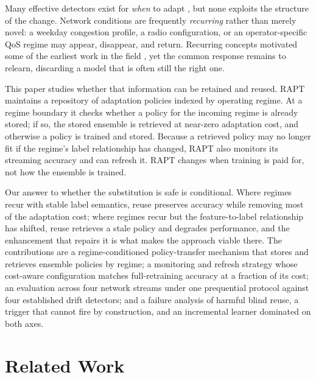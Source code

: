 \documentclass[conference]{IEEEtran}
\begin{document}
Many effective detectors exist for \emph{when} to adapt
\cite{bifet2007learning,page1954continuous,gama2004learning,baena2006early,ross2012exponentially,dos2016fast,brockhoff2020time},
but none exploits the structure of the change. Network conditions are
frequently \emph{recurring} rather than merely novel: a weekday congestion profile,
a radio configuration, or an operator-specific QoS regime may appear, disappear, and
return. Recurring concepts motivated some of the earliest work in the field
\cite{schlimmer1986incremental,widmer1994combining}, yet the common response remains
to relearn, discarding a model that is often still the right one.

This paper studies whether that information can be retained and reused. RAPT
maintains a repository of adaptation policies indexed by operating regime. At a
regime boundary it checks whether a policy for the incoming regime is already
stored; if so, the stored ensemble is retrieved at near-zero adaptation cost, and
otherwise a policy is trained and stored. Because a retrieved policy may no longer
fit if the regime's label relationship has changed, RAPT also monitors its
streaming accuracy and can refresh it. RAPT changes when training is paid for, not
how the ensemble is trained.

Our answer to whether the substitution is safe is conditional. Where regimes recur
with stable label semantics, reuse preserves accuracy while removing most of the
adaptation cost; where regimes recur but the feature-to-label relationship has
shifted, reuse retrieves a stale policy and degrades performance, and the
enhancement that repairs it is what makes the approach viable there. The
contributions are a regime-conditioned policy-transfer mechanism that stores and
retrieves ensemble policies by regime; a monitoring and refresh strategy whose
cost-aware configuration matches full-retraining accuracy at a fraction of its cost;
an evaluation across four network streams under one prequential protocol against four
established drift detectors; and a failure analysis of harmful blind reuse, a trigger
that cannot fire by construction, and an incremental learner dominated on both axes.

\section{Related Work}
\end{document}
